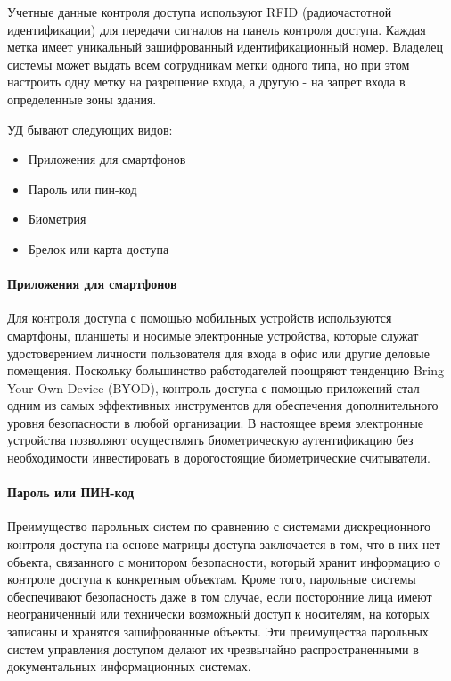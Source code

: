 Учетные данные контроля доступа используют RFID (радиочастотной идентификации) для передачи сигналов на панель контроля доступа. Каждая метка имеет уникальный зашифрованный идентификационный номер. Владелец системы может выдать всем сотрудникам метки одного типа, но при этом настроить одну метку на разрешение входа, а другую - на запрет входа в определенные зоны здания.

УД бывают следующих видов:

\begin{itemize}
	\item Приложения для смартфонов
	\item Пароль или пин-код
	\item Биометрия
	\item Брелок или карта доступа
\end{itemize}

\paragraph{Приложения для смартфонов}

Для контроля доступа с помощью мобильных устройств используются смартфоны, планшеты и носимые электронные устройства, которые служат удостоверением личности пользователя для входа в офис или другие деловые помещения. Поскольку большинство работодателей поощряют тенденцию Bring Your Own Device (BYOD), контроль доступа с помощью приложений стал одним из самых эффективных инструментов для обеспечения дополнительного уровня безопасности в любой организации. В настоящее время электронные устройства позволяют осуществлять биометрическую аутентификацию без необходимости инвестировать в дорогостоящие биометрические считыватели.

\paragraph{Пароль или ПИН-код}

Преимущество парольных систем по сравнению с системами дискреционного контроля доступа на основе матрицы доступа заключается в том, что в них нет объекта, связанного с монитором безопасности, который хранит информацию о контроле доступа к конкретным объектам. Кроме того, парольные системы обеспечивают безопасность даже в том случае, если посторонние лица имеют неограниченный или технически возможный доступ к носителям, на которых записаны и хранятся зашифрованные объекты. Эти преимущества парольных систем управления доступом делают их чрезвычайно распространенными в документальных информационных системах.

